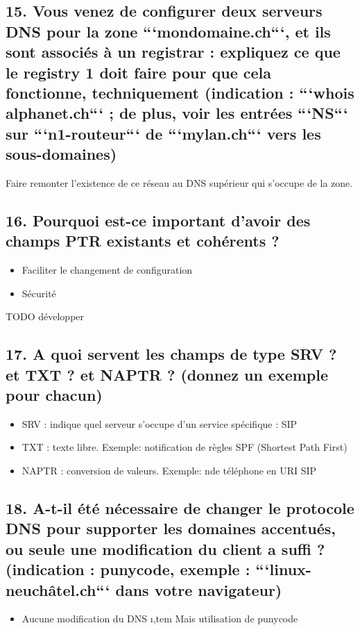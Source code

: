\documentclass{article}
\begin{document}
\subsection*{15. Vous venez de configurer deux serveurs DNS pour la zone ```mondomaine.ch```, et ils sont associés à un registrar : expliquez ce que le registry 1 doit faire pour que cela fonctionne, techniquement (indication : ```whois alphanet.ch``` ; de plus, voir les entrées ```NS``` sur ```n1-routeur``` de ```mylan.ch``` vers les sous-domaines)}
Faire remonter l'existence de ce réseau au DNS supérieur qui s'occupe de la zone.

\subsection*{16. Pourquoi est-ce important d’avoir des champs PTR existants et cohérents ?}
\begin{itemize}
\item Faciliter le changement de configuration
\item Sécurité
\end{itemize}
TODO développer

\subsection*{17. A quoi servent les champs de type SRV ? et TXT ? et NAPTR ? (donnez un exemple pour chacun)}
\begin{itemize}
\item SRV : indique quel serveur s'occupe d'un service spécifique : SIP
\item TXT : texte libre. Exemple: notification de règles SPF (Shortest Path First)
\item NAPTR : conversion de valeurs. Exemple: n\degre de téléphone en URI SIP
\end{itemize}

\subsection*{18. A-t-il été nécessaire de changer le protocole DNS pour supporter les domaines accentués, ou seule une modification du client a suffi ? (indication : punycode, exemple : ```linux-neuchâtel.ch``` dans votre navigateur)}
\begin{itemize}
\item Aucune modification du DNS
\i,tem Mais utilisation de punycode
\end{itemize}
\end{document}
